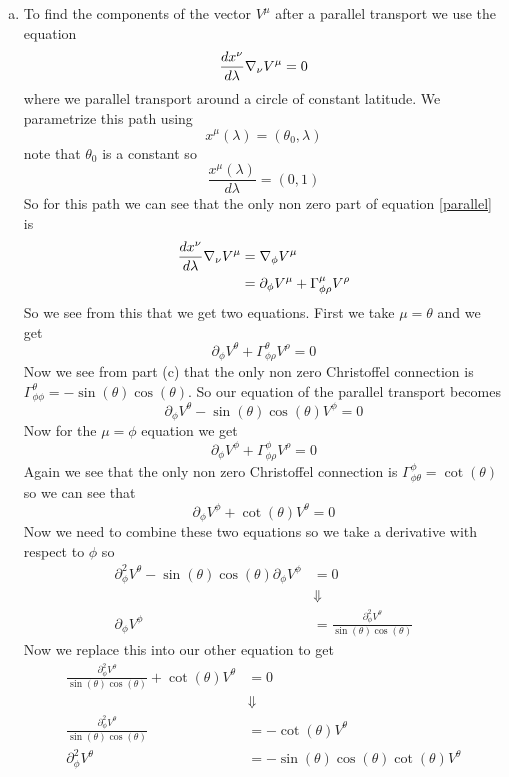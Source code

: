 \documentclass[11pt]{article}
\numberwithin{equation}{section}
\begin{document}
\begin{enumerate}[(a)]
\item
To find the components of the vector $V^{\mu}$ after a parallel transport we use the equation
\begin{equation}
\frac{dx^{\nu}}{d\lambda} \bold\nabla_{\nu}V^{\mu} = 0
\label{parallel}
\end{equation}
where we parallel transport around a circle of constant latitude. We parametrize this path using 
$$x^{\mu}(\lambda) = (\theta_0,\lambda)$$
note that $\theta_0$ is a constant so
$$\frac{x^{\mu}(\lambda)}{d\lambda} = (0,1)$$
So for this path we can see that the only non zero part of equation \ref{parallel} is
\begin{align*}
\frac{dx^{\nu}}{d\lambda} \bold\nabla_{\nu}V^{\mu} &= \bold\nabla_{\phi}V^{\mu}\\
&= \partial_{\phi}V^{\mu} + \Gamma^{\mu}_{\phi\rho}V^{\rho}
\end{align*}
So we see from this that we get two equations. First we take $\mu=\theta$ and we get
$$\partial_{\phi}V^{\theta} + \Gamma^{\theta}_{\phi\rho}V^{\rho} =0$$
Now we see from part (c) that the only non zero Christoffel connection is $\Gamma^{\theta}_{\phi\phi} = -\sin(\theta)\cos(\theta)$. So our equation of the parallel transport becomes
$$\partial_{\phi}V^{\theta} -\sin(\theta)\cos(\theta)V^{\phi} =0$$
Now for the $\mu=\phi$ equation we get
$$ \partial_{\phi}V^{\phi} + \Gamma^{\phi}_{\phi\rho}V^{\rho} = 0$$
Again we see that the only non zero Christoffel connection is $\Gamma^{\phi}_{\phi\theta} = \cot(\theta)$ so we can see that
$$ \partial_{\phi}V^{\phi} + \cot(\theta)V^{\theta} = 0$$
Now we need to combine these two equations so we take a derivative with respect to $\phi$ so
\begin{align*}
\partial^2_{\phi}V^{\theta} -\sin(\theta)\cos(\theta)\partial_{\phi}V^{\phi} &= 0\\
&\Downarrow\\
\partial_{\phi}V^{\phi} &= \frac{\partial^2_{\phi}V^{\theta}}{\sin(\theta)\cos(\theta)}
\end{align*}
Now we replace this into our other equation to get
\begin{align*}
 \frac{\partial^2_{\phi}V^{\theta}}{\sin(\theta)\cos(\theta)} + \cot(\theta)V^{\theta} &= 0\\
&\Downarrow\\
 \frac{\partial^2_{\phi}V^{\theta}}{\sin(\theta)\cos(\theta)} &=  -\cot(\theta)V^{\theta}\\
\partial^2_{\phi}V^{\theta} &=  -\sin(\theta)\cos(\theta)\cot(\theta)V^{\theta}\\

\end{align*}
\end{enumerate}
\end{document}
